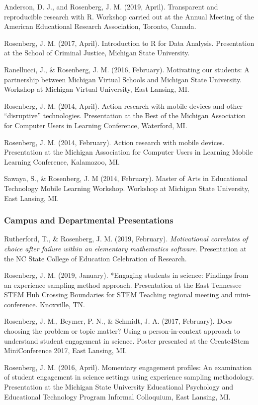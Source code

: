 \documentclass[14,]{article}
\begin{document}
Anderson, D. J., and Rosenberg, J. M. (2019, April). Transparent and
reproducible research with R. Workshop carried out at the Annual Meeting
of the American Educational Research Association, Toronto, Canada.

Rosenberg, J. M. (2017, April). Introduction to R for Data Analysis.
Presentation at the School of Criminal Justice, Michigan State
University.

Ranellucci, J., \& Rosenberg, J. M. (2016, February). Motivating our
students: A partnership between Michigan Virtual Schools and Michigan
State University. Workshop at Michigan Virtual University, East Lansing,
MI.

Rosenberg, J. M. (2014, April). Action research with mobile devices and
other ``disruptive'' technologies. Presentation at the Best of the
Michigan Association for Computer Users in Learning Conference,
Waterford, MI.

Rosenberg, J. M. (2014, February). Action research with mobile devices.
Presentation at the Michigan Association for Computer Users in Learning
Mobile Learning Conference, Kalamazoo, MI.

Sawaya, S., \& Rosenberg, J. M (2014, February). Master of Arts in
Educational Technology Mobile Learning Workshop. Workshop at Michigan
State University, East Lansing, MI.

\subsubsection{Campus and Departmental
Presentations}\label{campus-and-departmental-presentations}

Rutherford, T., \& Rosenberg, J. M. (2019, February). \emph{Motivational
correlates of choice after failure within an elementary mathematics
software}. Presentation at the NC State College of Education Celebration
of Research.

Rosenberg, J. M. (2019, January). *Engaging students in science:
Findings from an experience sampling method approach. Presentation at
the East Tennessee STEM Hub Crossing Boundaries for STEM Teaching
regional meeting and mini-conference. Knoxville, TN.

Rosenberg, J. M., Beymer, P. N., \& Schmidt, J. A. (2017, February).
Does choosing the problem or topic matter? Using a person-in-context
approach to understand student engagement in science. Poster presented
at the Create4Stem MiniConference 2017, East Lansing, MI.

Rosenberg, J. M. (2016, April). Momentary engagement profiles: An
examination of student engagement in science settings using experience
sampling methodology. Presentation at the Michigan State University
Educational Psychology and Educational Technology Program Informal
Colloquium, East Lansing, MI.
\end{document}
